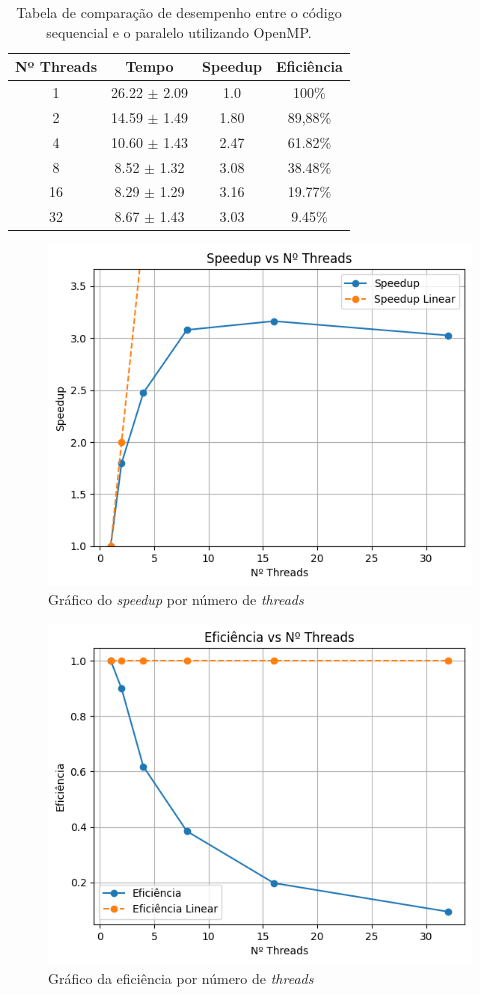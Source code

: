 \documentclass[12pt]{article}
\begin{document}
\begin{table}[ht]
\centering
\caption{Tabela de comparação de desempenho entre o código sequencial e o paralelo utilizando OpenMP.}
\vspace{0.3cm}
\begin{tabular}{||c c c c||} 
 \hline
 Nº Threads & Tempo & Speedup & Eficiência \\ [0.5ex] 
 \hline\hline
 1 & 26.22 $\pm$ 2.09 & 1.0 & 100\% \\ 
 \hline
 2 & 14.59 $\pm$ 1.49 & 1.80 & 89,88\% \\
 \hline
 4 & 10.60 $\pm$ 1.43 & 2.47 & 61.82\% \\
 \hline
 8 & 8.52 $\pm$ 1.32 & 3.08 & 38.48\% \\
 \hline
 16 & 8.29 $\pm$ 1.29 & 3.16 & 19.77\% \\
 \hline
 32 & 8.67 $\pm$ 1.43 & 3.03 & 9.45\% \\ 
 \hline
\end{tabular}
\end{table}

\begin{figure}[ht]
\centering
\includegraphics[width=.5\textwidth]{figs/speedupxthreads.png}
\caption{Gráfico do \textit{speedup} por número de \textit{threads}}
\label{fig:speedupOMP}
\end{figure}

\begin{figure}[ht]
\centering
\includegraphics[width=.5\textwidth]{figs/eficienciaxthreads.png}
\caption{Gráfico da eficiência por número de \textit{threads}}
\label{fig:eficienciaOMP}
\end{figure}
\end{document}

